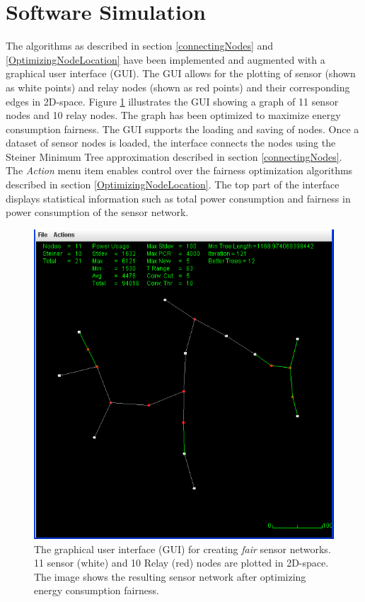 \section{Software Simulation}

The algorithms as described in section \ref{connectingNodes} and \ref{OptimizingNodeLocation} have been implemented and augmented with a graphical user interface (GUI). The GUI allows for the plotting of sensor (shown as white points) and relay nodes (shown as red points) and their corresponding edges in 2D-space. Figure \ref{gui} illustrates the GUI showing a graph of 11 sensor nodes and 10 relay nodes. The graph has been optimized to maximize energy consumption fairness. The GUI supports the loading and saving of nodes. Once a dataset of sensor nodes is loaded, the interface connects the nodes using the Steiner Minimum Tree approximation described in section \ref{connectingNodes}. The \textit{Action} menu item enables control over the fairness optimization algorithms described in section \ref{OptimizingNodeLocation}. The top part of the interface displays statistical information such as total power consumption and fairness in power consumption of the sensor network.

\begin{figure}[ht]
\includegraphics[scale=0.405]{images/graphical-interface.PNG}
\caption{The graphical user interface (GUI) for creating \textit{fair} sensor networks. 11 sensor (white) and 10 Relay (red) nodes are plotted in 2D-space. The image shows the resulting sensor network after optimizing energy consumption fairness.}
\label{gui}
\end{figure}